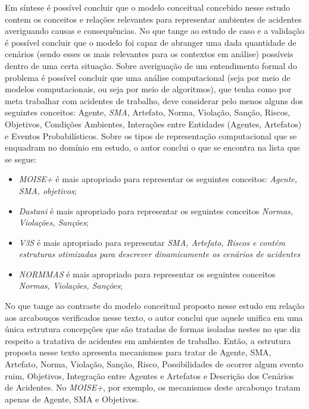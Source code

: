 Em síntese é possível concluir que o modelo conceitual concebido nesse estudo contem os conceitos e relações relevantes para representar ambientes de acidentes averiguando causas e consequências. No que tange ao estudo de caso e a validação é possível concluir que o modelo foi capaz de abranger uma dada quantidade de cenários (sendo esses os mais relevantes para os contextos em análise) possíveis dentro de uma certa situação. Sobre averiguação de um entendimento formal do problema é possível concluir que uma análise computacional (seja por meio de modelos computacionais, ou seja por meio de algoritmos), que tenha como por meta trabalhar com acidentes de trabalho, deve considerar pelo menos alguns dos seguintes conceitos: Agente, \textit{SMA}, Artefato, Norma, Violação, Sanção, Riscos, Objetivos, Condições Ambientes, Interações entre Entidades (Agentes, Artefatos) e Eventos Probabilísticos. Sobre os tipos de representação computacional que se enquadram no domínio em estudo, o autor conclui o que se encontra na lista que se segue:
\begin{itemize}
    \item \textit{MOISE+} é mais apropriado para representar os seguintes conceitos: \textit{Agente, SMA, objetivos};
    \item \textit{Dastani} é mais apropriado para representar os seguintes conceitos \textit{Normas, Violações, Sanções};
    \item \textit{V3S} é mais apropriado para representar \textit{SMA, Artefato, Riscos e contém estruturas otimizadas para descrever dinamicamente os cenários de acidentes}
    \item \textit{NORMMAS} é mais apropriado para representar os seguintes conceitos \textit{Normas, Violações, Sanções};
\end{itemize}

No que tange ao contraste do modelo conceitual proposto nesse estudo em relação aos arcabouços verificados nesse texto, o autor conclui que aquele unifica em uma única estrutura concepções que são tratadas de formas isoladas nestes no que diz respeito a tratativa de acidentes em ambientes de trabalho. Então, a estrutura proposta nesse texto apresenta mecanismos para tratar de Agente, SMA, Artefato, Norma, Violação, Sanção, Risco, Possibilidades de ocorrer algum evento ruim, Objetivos, Integração entre Agentes e Artefatos e Descrição dos Cenários de Acidentes. No \textit{MOISE+}, por exemplo, os mecanismos deste arcabouço tratam apenas de Agente, SMA e Objetivos.